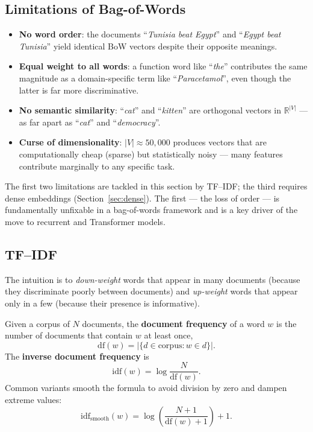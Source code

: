 \subsection{Limitations of Bag-of-Words}

\begin{itemize}
    \item \textbf{No word order}: the documents ``\emph{Tunisia beat Egypt}'' and ``\emph{Egypt beat Tunisia}'' yield identical BoW vectors despite their opposite meanings.
    \item \textbf{Equal weight to all words}: a function word like ``\emph{the}'' contributes the same magnitude as a domain-specific term like ``\emph{Paracetamol}'', even though the latter is far more discriminative.
    \item \textbf{No semantic similarity}: ``\emph{cat}'' and ``\emph{kitten}'' are orthogonal vectors in $\mathbb{R}^{|V|}$ --- as far apart as ``\emph{cat}'' and ``\emph{democracy}''.
    \item \textbf{Curse of dimensionality}: $|V| \approx 50{,}000$ produces vectors that are computationally cheap (sparse) but statistically noisy --- many features contribute marginally to any specific task.
\end{itemize}

The first two limitations are tackled in this section by TF--IDF; the third requires dense embeddings (Section~\ref{sec:dense}). The first --- the loss of order --- is fundamentally unfixable in a bag-of-words framework and is a key driver of the move to recurrent and Transformer models.

\subsection{TF--IDF}

The intuition is to \emph{down-weight} words that appear in many documents (because they discriminate poorly between documents) and \emph{up-weight} words that appear only in a few (because their presence is informative).

\begin{definition}
Given a corpus of $N$ documents, the \textbf{document frequency} of a word $w$ is the number of documents that contain $w$ at least once,
\[ \mathrm{df}(w) = \big|\{ d \in \text{corpus} : w \in d \}\big|. \]
The \textbf{inverse document frequency} is
\[ \mathrm{idf}(w) = \log \frac{N}{\mathrm{df}(w)}. \]
Common variants smooth the formula to avoid division by zero and dampen extreme values:
\[ \mathrm{idf}_{\text{smooth}}(w) = \log\left(\frac{N + 1}{\mathrm{df}(w) + 1}\right) + 1. \]
\end{definition}

